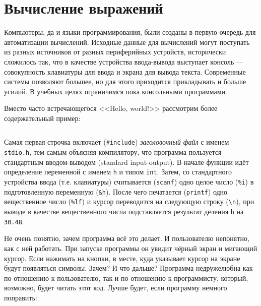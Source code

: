 \section{Вычисление выражений}

Компьютеры, да и языки программирования, были созданы в первую очередь для
автоматизации вычислений. Исходные данные для вычислений могут поступать из
разных источников от разных периферийных устройств, исторически сложилось так,
что в качестве устройства ввода-вывода выступает консоль --- совокупность
клавиатуры для ввода и экрана для вывода текста. Современные системы позволяют
большее, но для этого приходится прикладывать и больше усилий. В учебных целях
ограничимся пока консольными программами.

\zzneedspace
Вместо часто встречающегося <<Hello, world!>> рассмотрим более содержательный пример:
%
\inputminted{c}{samples/feet_bad.c}

Самая первая строчка включает (\texttt{\#include}) \textit{заголовочный файл} с
именем \texttt{stdio.h}, тем самым объясняя компилятору, что программа
пользуется стандартным вводом-выводом (standard input-output). В начале функции идёт определение
переменной с именем \texttt{h} и типом \texttt{int}. Затем, со стандартного устройства
ввода (т.е. клавиатуры) считывается (\texttt{scanf}) одно целое число
(\texttt{\%i}) в подготовленную переменную (\texttt{\&h}). После чего печатается
(\texttt{printf}) одно вещественное число (\texttt{\%lf}) и курсор переводится
на следующую строку (\verb|\n|), при выводе в качестве вещественного числа
подставляется результат деления \texttt{h} на \texttt{30.48}.

Не очень понятно, зачем программа всё это делает. И пользователю
непонятно, как с ней работать. При запуске программы он увидит чёрный экран и
мигающий курсор. Если нажимать на кнопки, в месте, куда указывает курсор на
экране будут появляться символы. Зачем? И что дальше? Программа недружелюбна
как по отношению к пользователю, так и по отношению к программисту, который,
возможно, будет читать этот код. Лучше будет, если программу немного
поправить:
%
\inputminted{c}{samples/feet.c}

